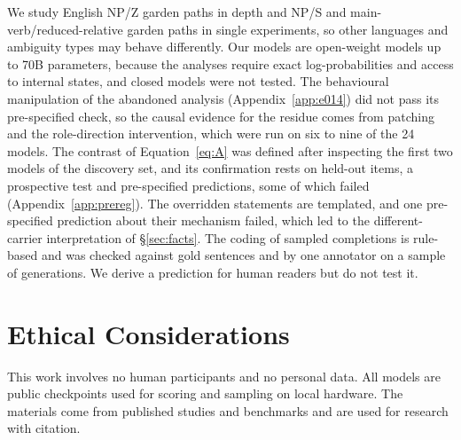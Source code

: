 \documentclass[11pt]{article}
\begin{document}
We study English NP/Z garden paths in depth and NP/S and main-verb/reduced-relative garden paths in single experiments, so other languages and ambiguity types may behave differently.
Our models are open-weight models up to 70B parameters, because the analyses require exact log-probabilities and access to internal states, and closed models were not tested.
The behavioural manipulation of the abandoned analysis (Appendix~\ref{app:e014}) did not pass its pre-specified check, so the causal evidence for the residue comes from patching and the role-direction intervention, which were run on six to nine of the 24 models.
The contrast of Equation~\ref{eq:A} was defined after inspecting the first two models of the discovery set, and its confirmation rests on held-out items, a prospective test and pre-specified predictions, some of which failed (Appendix~\ref{app:prereg}).
The overridden statements are templated, and one pre-specified prediction about their mechanism failed, which led to the different-carrier interpretation of \S\ref{sec:facts}.
The coding of sampled completions is rule-based and was checked against gold sentences and by one annotator on a sample of generations.
We derive a prediction for human readers but do not test it.

\section*{Ethical Considerations}

This work involves no human participants and no personal data.
All models are public checkpoints used for scoring and sampling on local hardware.
The materials come from published studies and benchmarks and are used for research with citation.




\end{document}
